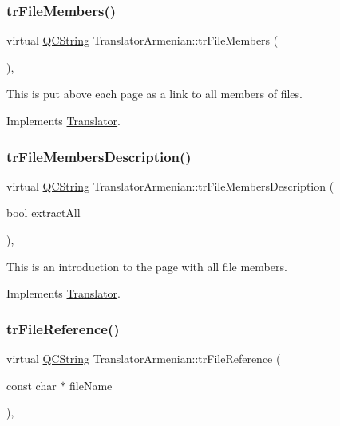 \subsubsection{\texorpdfstring{trFileMembers()}{trFileMembers()}}
{\footnotesize\ttfamily virtual \mbox{\hyperlink{class_q_c_string}{Q\+C\+String}} Translator\+Armenian\+::tr\+File\+Members (\begin{DoxyParamCaption}{ }\end{DoxyParamCaption})\hspace{0.3cm}{\ttfamily [inline]}, {\ttfamily [virtual]}}

This is put above each page as a link to all members of files. 

Implements \mbox{\hyperlink{class_translator}{Translator}}.

\mbox{\label{class_translator_armenian_a630d1e4b346b8637f27b0de3ea326dd7}} 
\subsubsection{\texorpdfstring{trFileMembersDescription()}{trFileMembersDescription()}}
{\footnotesize\ttfamily virtual \mbox{\hyperlink{class_q_c_string}{Q\+C\+String}} Translator\+Armenian\+::tr\+File\+Members\+Description (\begin{DoxyParamCaption}\item[{bool}]{extract\+All }\end{DoxyParamCaption})\hspace{0.3cm}{\ttfamily [inline]}, {\ttfamily [virtual]}}

This is an introduction to the page with all file members. 

Implements \mbox{\hyperlink{class_translator}{Translator}}.

\mbox{\label{class_translator_armenian_acaef7395a8abc490f5dbf2d6896d2ff6}} 
\subsubsection{\texorpdfstring{trFileReference()}{trFileReference()}}
{\footnotesize\ttfamily virtual \mbox{\hyperlink{class_q_c_string}{Q\+C\+String}} Translator\+Armenian\+::tr\+File\+Reference (\begin{DoxyParamCaption}\item[{const char $\ast$}]{file\+Name }\end{DoxyParamCaption})\hspace{0.3cm}{\ttfamily [inline]}, {\ttfamily [virtual]}}

